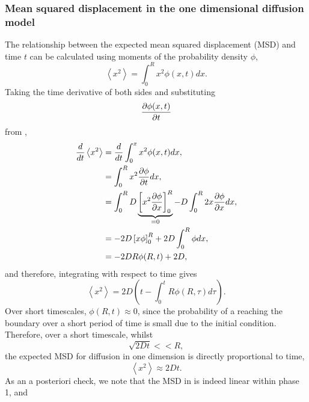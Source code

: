 \subsubsection{Mean squared displacement in the one dimensional diffusion model} \label{msd1d}
%
The relationship between the expected mean squared displacement (MSD) and time $t$
can be calculated using moments of the probability density $\phi$,
%
\begin{equation}
\left<x^2\right> = \int_0^R x^2 \phi(x,t) dx .
\label{eqn:MSD_expectation}
\end{equation}
%
Taking the time derivative of both sides and substituting
\begin{equation}
    \frac{\partial \phi(x,t)}{\partial t}
\end{equation} from ,
%
\begin{align}
\frac{d}{dt} \left<x^2\right> &= \frac{d}{dt}\int_0^x x^2 \phi(x,t) dx ,\nonumber\\
                           &= \int_0^{R}  x^2 \frac{\partial \phi}{\partial t} dx ,\nonumber\\
                           &= \int_0^{R} D \underbrace{\left[ x^2 \frac{\partial  \phi}{\partial  x} \right]_0^{R}}_{=0} - D \int_0^{R} 2x \frac{\partial \phi}{\partial x} dx, \nonumber\\
                            &= -2D \left[ x \phi \right]_0^{R} + 2D \int_0^{R} \phi dx , \nonumber\\
&= -2DR\phi(R,t) + 2D ,
\label{eqn:diffusion_1}
\end{align}
%
and therefore, integrating with respect to time gives
%
\begin{equation}
\left<x^2\right> = 2D \left( t - \int_0^t R \phi(R,\tau) d \tau \right).
\label{eqn:diffusion_msd1d}
\end{equation}
%
Over short timescales, $\phi(R,t) \approx 0$, since the probability of a reaching the boundary over a short period of time is small due to the initial condition. Therefore, over a short timescale, whilst
%
\begin{equation}
\sqrt{2Dt} <<R,
\end{equation}
%
the expected MSD for diffusion in one dimension is directly proportional to time,
%
\begin{equation}
\left<x^2\right> \approx 2Dt.
\label{eqn:diffusion_short1d}
\end{equation}
%
As an a posteriori check, we note that the MSD in  is indeed linear within phase 1, and
%
%
%
%
%


